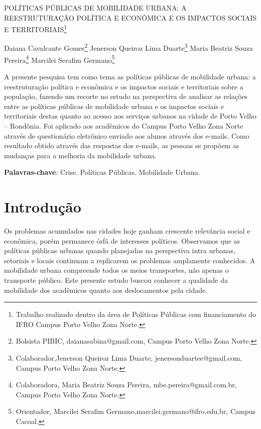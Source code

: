 \documentclass[article,12pt,onesidea,4paper,english,brazil]{abntex2}
\begin{document}
	
	
	\frenchspacing 
	
	\begin{center}
		\LARGE POLÍTICAS PÚBLICAS DE MOBILIDADE URBANA: A REESTRUTURAÇÃO POLÍTICA E ECONÔMICA E OS IMPACTOS SOCIAIS E TERRITORIAIS\footnote{Trabalho realizado dentro da área de Políticas Públicas com financiamento do IFRO Campus Porto Velho Zona Norte.}
		
		\normalsize
	Daiana Cavalcante Gomes\footnote{Bolsista PIBIC, daianasabina@gmail.com, Campus Porto Velho Zona Norte.} 
	Jenerson Queiroz Lima Duarte\footnote {Colaborador,Jenerson Queiroz Lima Duarte, jenersonduartee@gmail.com, Campus Porto Velho Zona Norte.} 
	Maria Beatriz Souza Pereira\footnote{Colaboradora, Maria Beatriz Souza Pereira, mbe.pereira@gmail.com.br, Campus Porto Velho Zona
		Norte.} 
	Marcilei Serafim Germano\footnote{Orientador, Marcilei Serafim Germano,marcilei.germano@ifro.edu.br, Campus Cacoal.} 
	\end{center}
	
	\begin{resumoumacoluna}
	A presente pesquisa tem como tema as políticas públicas de mobilidade urbana: a reestruturação política e econômica e os impactos sociais e territoriais sobre a população, fazendo um recorte no estudo na perspectiva de analisar as relações entre as políticas públicas de mobilidade urbana e os impactos sociais e territoriais destas quanto ao acesso aos serviços urbanos na cidade de Porto Velho
	– Rondônia. Foi aplicado aos acadêmicos do Campus Porto Velho Zona Norte através de questionário eletrônico enviado aos alunos através dos e-mails. Como resultado obtido através das respostas dos e-mails, as pessoas se propõem as mudanças para a melhoria da mobilidade urbana.
		
		\vspace{\onelineskip}
		
		\noindent
		\textbf{Palavras-chave}: Crise. Políticas Públicas. Mobilidade Urbana.
	\end{resumoumacoluna}
	
	\textual
	
	\section*{Introdução}
	
	Os problemas acumulados nas cidades hoje ganham crescente relevância social e econômica, porém permanece órfã de interesses políticos. Observamos que as políticas públicas urbanas quando planejadas na perspectiva intra urbanas, setoriais e locais continuam a replicarem os problemas amplamente conhecidos. A mobilidade urbana compreende todos os meios transportes, não apenas o transporte público. Este presente estudo buscou conhecer a qualidade da mobilidade dos acadêmicos quanto aos deslocamentos pela cidade.
	
\end{document}
